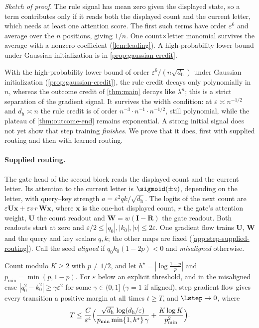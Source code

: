 \emph{Sketch of proof.} The rule signal has mean zero given the displayed state, so a term contributes
only if it reads both the displayed count and the current letter, which needs at least one attention
score. The first such terms have order $\varepsilon^6$ and average over the $n$ positions, giving $1/n$. One
count$\times$letter monomial survives the average with a nonzero coefficient (\cref{lem:leading}).
A high-probability lower bound under Gaussian initialization is in \cref{prop:gaussian-credit}.

With the high-probability lower bound of order $\varepsilon^6/(n\sqrt{d_{\mathrm h}})$ under Gaussian initialization
(\cref{prop:gaussian-credit}), the rule credit decays only polynomially in $n$, whereas the outcome credit of \cref{thm:main}
decays like $\lambda^n$; this is a strict separation of the gradient signal. It survives the width condition: at
$\varepsilon\asymp n^{-1/2}$ and $d_{\mathrm h}\asymp n$ the rule credit is of order $n^{-3}\cdot n^{-1}\cdot n^{-1/2}$, still polynomial, while the plateau of
\cref{thm:outcome-end} remains exponential. A strong initial signal does not yet show
that step training \emph{finishes}. We prove that it does, first with supplied routing and then with learned routing.

\paragraph{Supplied routing.} The gate head of the second block reads the displayed count and the current letter. Its
attention to the current letter is $\sigmoid(\pm a)$, depending on the letter, with query--key strength
$a=\varepsilon^2qk/\sqrt{d_{\mathrm h}}$. The logits of the next count are $\varepsilon\mathbf U\bm x+\varepsilon v\,r\,\mathbf W\bm x$, where
$\bm x$ is the one-hot displayed count, $r$ the gate's attention weight, $\mathbf U$ the count readout and $\mathbf W=w(\mathbf I-\mathbf R)$
the gate readout. Both readouts start at zero and $\varepsilon/2\le|q_0|,|k_0|,|v|\le2\varepsilon$. One gradient flow trains
$\mathbf U$, $\mathbf W$ and the query and key scalars $q,k$; the other maps are fixed (\cref{app:step-supplied-routing}). Call the seed
\emph{aligned} if $q_0k_0(1-2p)<0$ and \emph{misaligned} otherwise.

\begin{theorem}
\label{thm:joint}
Count modulo $K\ge2$ with $p\ne1/2$, and let $h^\star=|\log\frac{1-p}p|$ and $p_{\min}=\min(p,1-p)$. For $\varepsilon$ below an
explicit threshold, and in the misaligned case $|q_0^2-k_0^2|\ge\gamma\varepsilon^2$ for some $\gamma\in(0,1]$ ($\gamma=1$ if aligned),
step gradient flow gives every transition a positive margin at all times $t\ge T$, and $\Lstep\to0$, where
\[
 T\le\frac{C}{\varepsilon^4}\Bigl(\frac{\sqrt{d_{\mathrm h}}\,\log(d_{\mathrm h}/\varepsilon)}{p_{\min}\min\{1,h^\star\}\,\gamma}+\frac{K\log K}{p_{\min}^2}\Bigr).
\]
\end{theorem}

